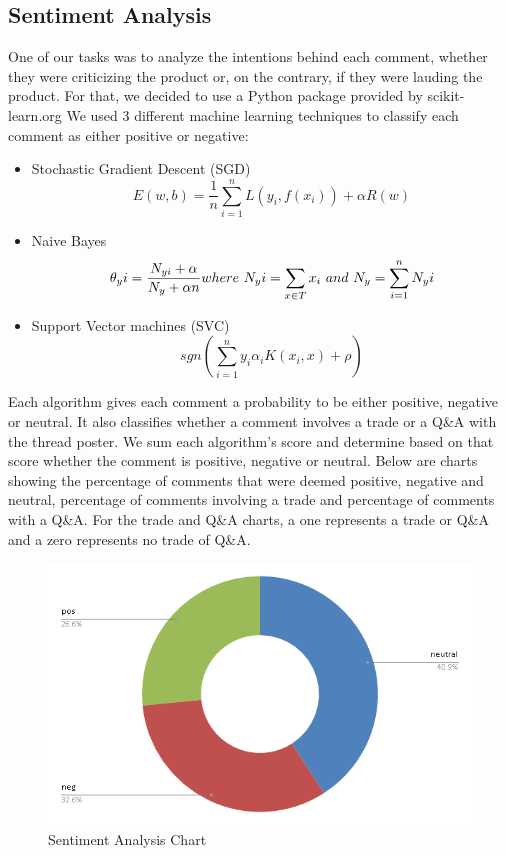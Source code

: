 \documentclass[sigconf]{acmart}
\begin{document}
\subsection{Sentiment Analysis}
One of our tasks was to analyze the intentions behind each comment, whether
they were criticizing the product or, on the contrary, if they were lauding
the product. For that, we decided to use a Python package provided by scikit-learn.org
We used 3 different machine learning techniques to classify each comment as
either positive or negative:
\begin{itemize}
  \item Stochastic Gradient Descent (SGD)
  \begin{equation*}
    E(w,b) = \frac{1}{n} \sum\limits_{i=1}^nL(y_i, f(x_i)) + \alpha R(w)
  \end{equation*} \cite{SGD}

  \item Naive Bayes
  \begin{equation*}
    \theta_yi = \frac{N_{yi} + \alpha}{N_y + \alpha n}
    \newline
    where\ N_yi = \sum_{x\in T} x_i\ and\ N_y = \sum\limits_{i=1}^n N_yi
  \end{equation*}\cite{NB}

  \item Support Vector machines (SVC)
  \begin{equation*}  
      sgn(\sum\limits_{i=1}^n y_i \alpha_i K(x_i, x) + \rho)    
  \end{equation*}\cite{SVC}
\end{itemize}

Each algorithm gives each comment a probability to be either positive, negative or neutral. It also classifies whether a comment 
involves a trade or a Q\&A with the thread poster. We sum each algorithm's score 
and determine based on that score whether the comment is positive,
negative or neutral. Below are charts showing the percentage of comments that 
were deemed positive, negative and neutral, percentage of comments involving a 
trade and percentage of comments with a Q\&A. For the trade and Q\&A charts, a 
one represents a trade or Q\&A and a zero represents no trade of Q\&A.

\begin{figure}[h]
	\centering
	\includegraphics[width=.5\textwidth]{SentimentChart.png}
	\caption{Sentiment Analysis Chart}
\end{figure}
\end{document}
